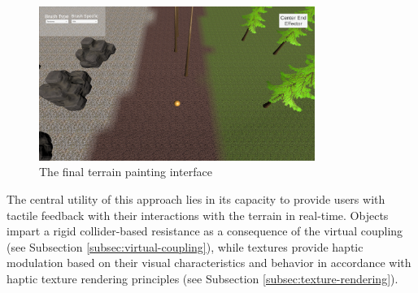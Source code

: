 \begin{figure}[htbp]
    \centering
    \includegraphics[width=0.8\textwidth]{images/approach-terrain-painter.png} 
    \caption{The final terrain painting interface}
    \label{fig:terrain-painting}
\end{figure}

The central utility of this approach lies in its capacity to provide users with tactile feedback with their interactions with the terrain in real-time. Objects impart a rigid collider-based resistance as a consequence of the virtual coupling (see Subsection \ref{subsec:virtual-coupling}), while textures provide haptic modulation based on their visual characteristics and behavior in accordance with haptic texture rendering principles (see Subsection \ref{subsec:texture-rendering}).
